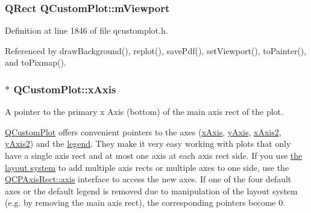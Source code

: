 \hypertarget{class_q_custom_plot_ac0a7c38a715526c257cff95774f83ab6}{}
\subsubsection[{m\+Viewport}]{\setlength{\rightskip}{0pt plus 5cm}Q\+Rect Q\+Custom\+Plot\+::m\+Viewport\hspace{0.3cm}{\ttfamily [protected]}}\label{class_q_custom_plot_ac0a7c38a715526c257cff95774f83ab6}


Definition at line 1846 of file qcustomplot.\+h.



Referenced by draw\+Background(), replot(), save\+Pdf(), set\+Viewport(), to\+Painter(), and to\+Pixmap().

\hypertarget{class_q_custom_plot_a9a79cd0158a4c7f30cbc702f0fd800e4}{}
\subsubsection[{x\+Axis}]{ $\ast$ Q\+Custom\+Plot\+::x\+Axis}\label{class_q_custom_plot_a9a79cd0158a4c7f30cbc702f0fd800e4}
A pointer to the primary x Axis (bottom) of the main axis rect of the plot.

\hyperlink{class_q_custom_plot}{Q\+Custom\+Plot} offers convenient pointers to the axes (\hyperlink{class_q_custom_plot_a9a79cd0158a4c7f30cbc702f0fd800e4}{x\+Axis}, \hyperlink{class_q_custom_plot_af6fea5679725b152c14facd920b19367}{y\+Axis}, \hyperlink{class_q_custom_plot_ada41599f22cad901c030f3dcbdd82fd9}{x\+Axis2}, \hyperlink{class_q_custom_plot_af13fdc5bce7d0fabd640f13ba805c0b7}{y\+Axis2}) and the \hyperlink{class_q_custom_plot_a4eadcd237dc6a09938b68b16877fa6af}{legend}. They make it very easy working with plots that only have a single axis rect and at most one axis at each axis rect side. If you use \hyperlink{}{the layout system} to add multiple axis rects or multiple axes to one side, use the \hyperlink{class_q_c_p_axis_rect_a560de44e47a4af0f86c59102a094b1e4}{Q\+C\+P\+Axis\+Rect\+::axis} interface to access the new axes. If one of the four default axes or the default legend is removed due to manipulation of the layout system (e.\+g. by removing the main axis rect), the corresponding pointers become 0. 


